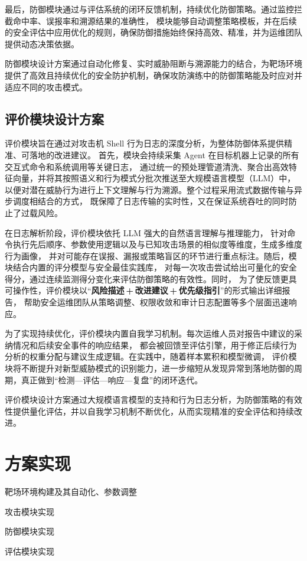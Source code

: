 \documentclass[lang=cn,10pt]{elegantbook}
\begin{document}
最后，防御模块通过与评估系统的闭环反馈机制，持续优化防御策略。通过监控拦截命中率、误报率和溯源结果的准确性，
模块能够自动调整策略模板，并在后续的安全评估中应用优化的规则，确保防御措施始终保持高效、精准，并为运维团队提供动态决策依据。


\begin{definition}
防御模块设计方案通过自动化修复、实时威胁阻断与溯源能力的结合，为靶场环境提供了高效且持续优化的安全防护机制，确保攻防演练中的防御策略能及时应对并适应不同的攻击模式。
\end{definition}


\section{评价模块设计方案}

评价模块旨在通过对攻击机 Shell 行为日志的深度分析，为整体防御体系提供精准、可落地的改进建议。
首先，模块会持续采集 Agent 在目标机器上记录的所有交互式命令和系统调用等关键日志，
通过统一的预处理管道清洗、聚合出高效特征向量，并将其按照语义和行为模式分批次推送至大规模语言模型（LLM）中，
以便对潜在威胁行为进行上下文理解与行为溯源。整个过程采用流式数据传输与异步调度相结合的方式，
既保障了日志传输的实时性，又在保证系统吞吐的同时防止了过载风险。

在日志解析阶段，评价模块依托 LLM 强大的自然语言理解与推理能力，
针对命令执行先后顺序、参数使用逻辑以及与已知攻击场景的相似度等维度，生成多维度行为画像，
并对可能存在误报、漏报或策略盲区的环节进行重点标注。随后，模块结合内置的评分模型与安全最佳实践库，
对每一次攻击尝试给出可量化的安全得分，通过连续监测得分变化来评估防御策略的有效性。同时，
为了使反馈更具可操作性，评价模块以“\textbf{风险描述 + 改进建议 + 优先级指引}”的形式输出详细报告，
帮助安全运维团队从策略调整、权限收敛和审计日志配置等多个层面迅速响应。

为了实现持续优化，评价模块内置自我学习机制。每次运维人员对报告中建议的采纳情况和后续安全事件的响应结果，
都会被回馈至评估引擎，用于修正后续行为分析的权重分配与建议生成逻辑。在实践中，随着样本累积和模型微调，
评价模块将不断提升对新型威胁模式的识别能力，进一步缩短从发现异常到落地防御的周期，真正做到“检测—评估—响应—复盘”的闭环迭代。

\begin{definition}
评价模块设计方案通过大规模语言模型的支持和行为日志分析，为防御策略的有效性提供量化评估，并以自我学习机制不断优化，从而实现精准的安全评估和持续改进。
\end{definition}




\chapter{方案实现}
\begin{introduction}
  \item 靶场环境构建及其自动化、参数调整
  \item 攻击模块实现
  \item 防御模块实现
  \item 评估模块实现
\end{introduction}
\end{document}
